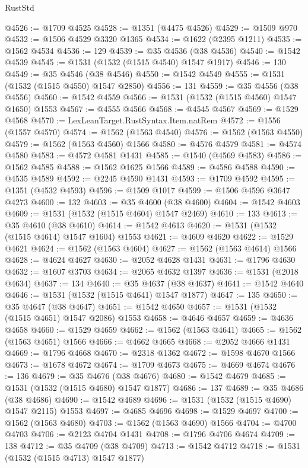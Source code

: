 \begin{lexlean}{RustStd}
\begin{coremodule}
@4526 := @1709 @4525
@4528 := @1351 (@4475 @4526)
@4529 := @1509 @970
@4532 := @1506 @4529 @3320 @1365
@4534 := @1622 (@2395 @1211)
@4535 := @1562 @4534
@4536 := 129
@4539 := @35 @4536 (@38 @4536)
@4540 := @1542 @4539
@4545 := @1531 (@1532 (@1515 @4540) @1547 @1917)
@4546 := 130
@4549 := @35 @4546 (@38 @4546)
@4550 := @1542 @4549
@4555 := @1531 (@1532 (@1515 @4550) @1547 @2850)
@4556 := 131
@4559 := @35 @4556 (@38 @4556)
@4560 := @1542 @4559
@4566 := @1531 (@1532 (@1515 @4560) @1547 @1650) @1553
@4567 := @4555 @4566
@4568 := @4545 @4567
@4569 := @1529 @4568
@4570 := LexLeanTarget.RustSyntax.Item.natRem
@4572 := @1556 (@1557 @4570)
@4574 := @1562 (@1563 @4540)
@4576 := @1562 (@1563 @4550)
@4579 := @1562 (@1563 @4560) @1566
@4580 := @4576 @4579
@4581 := @4574 @4580
@4583 := @4572 @4581 @1431
@4585 := @1540 (@4569 @4583)
@4586 := @1562 @4585
@4588 := @1562 @1625 @1566
@4589 := @4586 @4588
@4590 := @4535 @4589
@4592 := @2245 @4590 @1431
@4593 := @1709 @4592
@4595 := @1351 (@4532 @4593)
@4596 := @1509 @1017
@4599 := @1506 @4596 @3647 @4273
@4600 := 132
@4603 := @35 @4600 (@38 @4600)
@4604 := @1542 @4603
@4609 := @1531 (@1532 (@1515 @4604) @1547 @2469)
@4610 := 133
@4613 := @35 @4610 (@38 @4610)
@4614 := @1542 @4613
@4620 := @1531 (@1532 (@1515 @4614) @1547 @1604) @1553
@4621 := @4609 @4620
@4622 := @1529 @4621
@4624 := @1562 (@1563 @4604)
@4627 := @1562 (@1563 @4614) @1566
@4628 := @4624 @4627
@4630 := @2052 @4628 @1431
@4631 := @1796 @4630
@4632 := @1607 @3703
@4634 := @2065 @4632 @1397
@4636 := @1531 (@2018 @4634)
@4637 := 134
@4640 := @35 @4637 (@38 @4637)
@4641 := @1542 @4640
@4646 := @1531 (@1532 (@1515 @4641) @1547 @1877)
@4647 := 135
@4650 := @35 @4647 (@38 @4647)
@4651 := @1542 @4650
@4657 := @1531 (@1532 (@1515 @4651) @1547 @2086) @1553
@4658 := @4646 @4657
@4659 := @4636 @4658
@4660 := @1529 @4659
@4662 := @1562 (@1563 @4641)
@4665 := @1562 (@1563 @4651) @1566
@4666 := @4662 @4665
@4668 := @2052 @4666 @1431
@4669 := @1796 @4668
@4670 := @2318 @1362
@4672 := @1598 @4670 @1566
@4673 := @1678 @4672
@4674 := @1709 @4673
@4675 := @4669 @4674
@4676 := 136
@4679 := @35 @4676 (@38 @4676)
@4680 := @1542 @4679
@4685 := @1531 (@1532 (@1515 @4680) @1547 @1877)
@4686 := 137
@4689 := @35 @4686 (@38 @4686)
@4690 := @1542 @4689
@4696 := @1531 (@1532 (@1515 @4690) @1547 @2115) @1553
@4697 := @4685 @4696
@4698 := @1529 @4697
@4700 := @1562 (@1563 @4680)
@4703 := @1562 (@1563 @4690) @1566
@4704 := @4700 @4703
@4706 := @2123 @4704 @1431
@4708 := @1796 @4706 @4674
@4709 := 138
@4712 := @35 @4709 (@38 @4709)
@4713 := @1542 @4712
@4718 := @1531 (@1532 (@1515 @4713) @1547 @1877)

\end{coremodule}
\end{lexlean}
